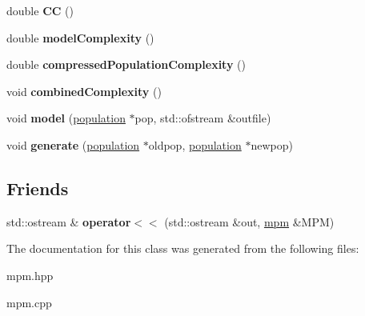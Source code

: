 \begin{DoxyCompactItemize}
\item 
\hypertarget{classmpm_a02c301e0a293699c7ae92329862a1b08}{double {\bfseries \-C\-C} ()}\label{classmpm_a02c301e0a293699c7ae92329862a1b08}

\item 
\hypertarget{classmpm_a08045e5f8fe54521effade015b4b210c}{double {\bfseries model\-Complexity} ()}\label{classmpm_a08045e5f8fe54521effade015b4b210c}

\item 
\hypertarget{classmpm_a36d82e1439f6a5c3580c64a80aba0e85}{double {\bfseries compressed\-Population\-Complexity} ()}\label{classmpm_a36d82e1439f6a5c3580c64a80aba0e85}

\item 
\hypertarget{classmpm_a920836838950f3266374fa901eec70a5}{void {\bfseries combined\-Complexity} ()}\label{classmpm_a920836838950f3266374fa901eec70a5}

\item 
\hypertarget{classmpm_a8576b9ac6f4b9c60c373f72b345c5b48}{void {\bfseries model} (\hyperlink{classpopulation}{population} $\ast$pop, std\-::ofstream \&outfile)}\label{classmpm_a8576b9ac6f4b9c60c373f72b345c5b48}

\item 
\hypertarget{classmpm_a65b637ecc790f3cef46061fcdd6c5635}{void {\bfseries generate} (\hyperlink{classpopulation}{population} $\ast$oldpop, \hyperlink{classpopulation}{population} $\ast$newpop)}\label{classmpm_a65b637ecc790f3cef46061fcdd6c5635}

\end{DoxyCompactItemize}
\subsection*{\-Friends}
\begin{DoxyCompactItemize}
\item 
\hypertarget{classmpm_aaf37e4bce650913b43e3fb86b9b355e8}{std\-::ostream \& {\bfseries operator$<$$<$} (std\-::ostream \&out, \hyperlink{classmpm}{mpm} \&\-M\-P\-M)}\label{classmpm_aaf37e4bce650913b43e3fb86b9b355e8}

\end{DoxyCompactItemize}


\-The documentation for this class was generated from the following files\-:\begin{DoxyCompactItemize}
\item 
mpm.\-hpp\item 
mpm.\-cpp\end{DoxyCompactItemize}
